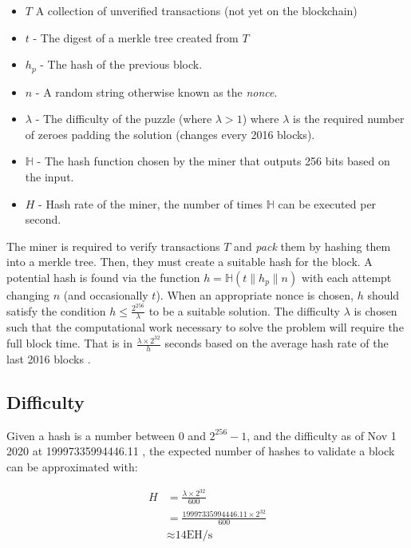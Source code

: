 \begin{itemize}
  \item $T$ A collection of unverified transactions (not yet on the blockchain)
  \item $t$ - The digest of a merkle tree created from $T$
  \item $h_p$ - The hash of the previous block.
  \item $n$ - A random string otherwise known as the \textit{nonce}.
  \item $\lambda$ - The difficulty of the puzzle (where $\lambda > 1$) where $\lambda$ is the required number of zeroes padding the solution (changes every 2016 blocks).
  \item $\mathbb{H}$ - The hash function chosen by the miner that outputs 256 bits based on the input.
  \item $H$ - Hash rate of the miner, the number of times $\mathbb{H}$ can be executed per second.
\end{itemize}

The miner is required to verify transactions $T$ and \textit{pack} them by hashing them into a merkle tree. Then, they must create a suitable hash for the block. A potential hash is found via the function $h = \mathbb{H}(t \| h_p \| n)$ with each attempt changing $n$ (and occasionally $t$). When an appropriate nonce is chosen, $h$ should satisfy the condition $h \leq \frac{2^{256}}{\lambda}$ to be a suitable solution. The difficulty $\lambda$ is chosen such that the computational work necessary to solve the problem will require the full block time. That is in $\frac{\lambda \times 2^{32}}{h}$ seconds based on the average hash rate of the last 2016 blocks \cite{difficulty2019}.

\subsection{Difficulty}

Given a hash is a number between 0 and $2^{256}-1$, and the difficulty as of Nov 1 2020 at 19997335994446.11 \cite{chainquery2020}, the expected number of hashes to validate a block can be approximated \cite{difficulty2019} with:

\begin{align}
    H &= \frac{\lambda \times 2^{32}}{600} \\
    &= \frac{19997335994446.11 \times 2^{32}}{600} \\
    & \approx \text{14EH/s}
\end{align} 

